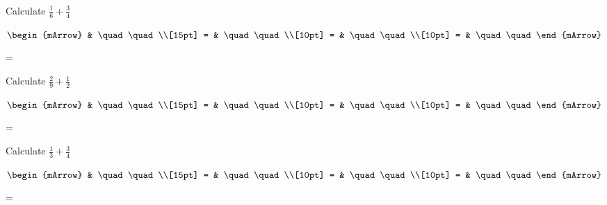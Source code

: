 \begin{mtask}
\begin{exercise}
\begin{envSolution}
           \end{envSolution}
         \end{exercise}
   \task \begin{exercise} Calculate $ \frac{1}{6} + \frac{3}{4} $
           \begin{envSolution}
             $\begin{mArrow} 
			       & \quad \quad              \\[15pt]
                 = & \quad \quad              \\[10pt]
		   		 = & \quad \quad              \\[10pt]
				 = & \quad \quad 
              \end{mArrow}$
            \begin{shortsolution}  
			     =$ \quad \quad \quad \quad$
			\end{shortsolution}				 
           \end{envSolution}
         \end{exercise}
   \task \begin{exercise} Calculate $ \frac{2}{9} + \frac{1}{2} $
           \begin{envSolution}
             $\begin{mArrow} 
			       & \quad \quad              \\[15pt]
                 = & \quad \quad              \\[10pt]
		   		 = & \quad \quad              \\[10pt]
				 = & \quad \quad 
              \end{mArrow}$
            \begin{shortsolution}  
			     =$ \quad \quad \quad \quad$
			\end{shortsolution}				 
           \end{envSolution}
         \end{exercise}
   \task \begin{exercise} Calculate $ \frac{1}{3} + \frac{3}{4} $
           \begin{envSolution}
             $\begin{mArrow} 
			       & \quad \quad              \\[15pt]
                 = & \quad \quad              \\[10pt]
		   		 = & \quad \quad              \\[10pt]
				 = & \quad \quad 
              \end{mArrow}$
            \begin{shortsolution}  
			     =$ \quad \quad \quad \quad$
			\end{shortsolution}				 
           \end{envSolution}
         \end{exercise}
\end{mtask}

